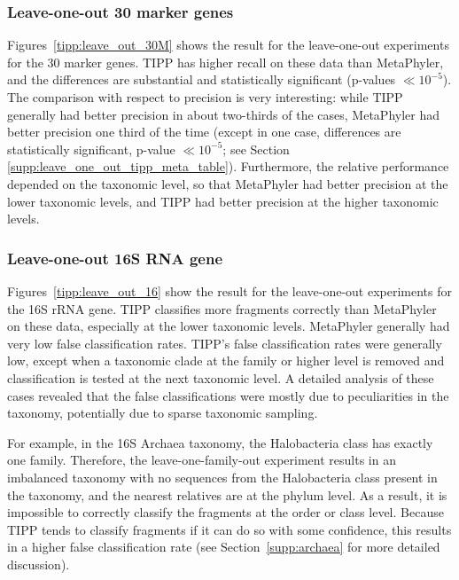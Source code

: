 \subsubsection{Leave-one-out 30 marker genes}
Figures~\ref{tipp:leave_out_30M} shows the result for the leave-one-out
experiments for the 30 marker genes. 
TIPP has higher recall on these data than
MetaPhyler, and the differences are substantial and
statistically significant (p-values $\ll 10^{-5}$).
The comparison with respect to precision
is very interesting:
while TIPP generally had better precision in about two-thirds of
the cases,
 MetaPhyler had better precision one third of the time (except in one case, 
differences are statistically significant, p-value $\ll10^{-5}$; see Section \ref{supp:leave_one_out_tipp_meta_table}).
Furthermore, the relative performance depended on the
taxonomic level, so that
MetaPhyler had better precision
at the lower taxonomic levels,
and TIPP had better precision at the higher
taxonomic levels.

\subsubsection{Leave-one-out 16S RNA gene}
Figures~\ref{tipp:leave_out_16}
show the result for the leave-one-out experiments for the 16S rRNA
gene.  TIPP classifies more fragments correctly
than MetaPhyler on these data, especially at the lower taxonomic levels.
MetaPhyler generally had very low false classification
rates.  TIPP's false classification
rates were generally low, except 
when a taxonomic clade at the family or higher level is removed 
and classification is tested at the next taxonomic level.
A detailed analysis of these cases revealed that
the false classifications were mostly due
to peculiarities in the taxonomy,
potentially due to sparse taxonomic 
sampling.  

For example, in the 16S Archaea taxonomy, the Halobacteria class has exactly one family.  Therefore, the leave-one-family-out experiment results in an imbalanced taxonomy with no sequences from the Halobacteria class present in the taxonomy, and the nearest relatives are at the phylum level.  As a result, it is impossible to correctly classify the fragments at the order or class level.  Because TIPP tends to classify fragments if it can do so with some confidence, this results in a higher false classification rate (see Section~\ref{supp:archaea} for more detailed discussion).  

